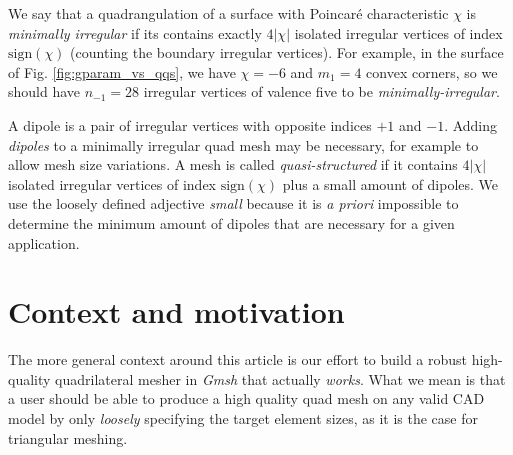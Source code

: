 \documentclass[AMA,STIX1COL]{WileyNJD-v2}
\newcommand\notes[1]{\textcolor{red}{(//c: #1)}}
\newcommand\rfig[1]{Fig. \ref{#1}}
\begin{document}
{We say that a quadrangulation of a surface with Poincar\'e characteristic $\chi$ is
\emph{minimally irregular} if its contains exactly $4|\chi|$ isolated irregular
vertices of index $\mbox{sign}(\chi)$ (counting the boundary irregular vertices).
For example, in the surface of
\rfig{fig:gparam_vs_qqs}, we have $\chi = -6$ and $m_1 = 4$ convex corners,
so we should have $n_{-1} = 28$ irregular vertices of valence five to be
\emph{minimally-irregular}.


A dipole is a
pair of irregular vertices with opposite indices $+1$ and $-1$.
Adding \emph{dipoles} to a minimally irregular quad
mesh may be necessary, for example to allow
mesh size variations. 
A mesh is called \emph{quasi-structured} if
it contains $4|\chi|$ isolated irregular vertices of index
$\mbox{sign}(\chi)$ plus a small amount of dipoles. 
We use the loosely defined adjective \emph{small} because it is {\it a
  priori} impossible to determine the minimum amount of dipoles that
are necessary for a given application.






\section{Context and motivation}
\label{ss:motivation}

The more general context around this article is our effort to build a robust
high-quality quadrilateral mesher in \emph{Gmsh} that actually \emph{works}.
What we mean is that a user should be able to produce a high quality quad mesh on any
valid CAD model by only \emph{loosely} specifying the target element sizes, 
as it is the case for triangular meshing.


}
\end{document}
